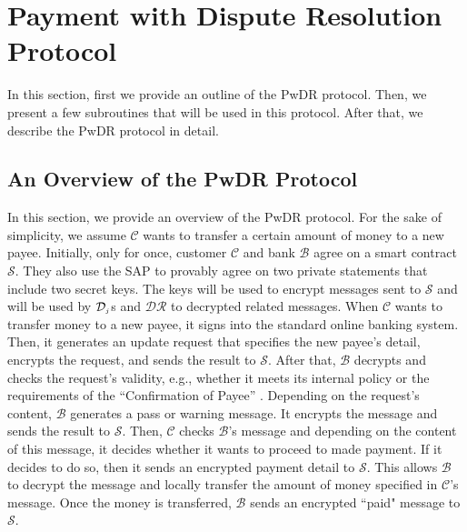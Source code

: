 







\section{Payment with Dispute Resolution Protocol}

In this section, first we  provide an outline of the PwDR protocol. Then, we present a few subroutines that will be used in this protocol. After that, we describe the PwDR protocol in detail. 




\subsection{An Overview of  the PwDR Protocol}


In this section, we provide an overview of the  PwDR protocol. For the sake of simplicity, we assume $\mathcal{C}$ wants to transfer a certain amount of money to a new payee. Initially, only for once,  customer  $\mathcal{C}$ and bank  $\mathcal{B}$   agree on a smart contract  $\mathcal{S}$. They also use the SAP to provably agree on two private statements that include two  secret keys. The keys will be used to encrypt  messages sent to $\mathcal{S}$ and will be used  by $\mathcal{D}_{\scriptscriptstyle j}$s and $\mathcal{DR}$ to decrypted related messages. When $\mathcal{C}$ wants to transfer money to a new payee, it   signs into the standard online banking system. Then, it generates an update  request that specifies the new payee's detail,  encrypts the request, and sends the result to  $\mathcal{S}$. After that, $\mathcal{B}$ decrypts and checks the request's validity, e.g.,  whether it  meets its internal policy or  the requirements of the ``Confirmation of Payee'' \cite{CoP}. Depending on the  request's content, $\mathcal{B}$ generates a pass or warning message. It encrypts the message and sends the result to $\mathcal{S}$. Then, $\mathcal{C}$ checks $\mathcal{B}$'s message and depending on the content of this message, it decides whether it wants to proceed to made  payment. If it decides to do so, then it sends an encrypted payment detail to $\mathcal{S}$. This  allows $\mathcal{B}$ to decrypt the message and locally transfer the amount of money specified in $\mathcal{C}$'s message. Once the money is transferred, $\mathcal{B}$ sends an encrypted  ``paid" message to $\mathcal{S}$. 


